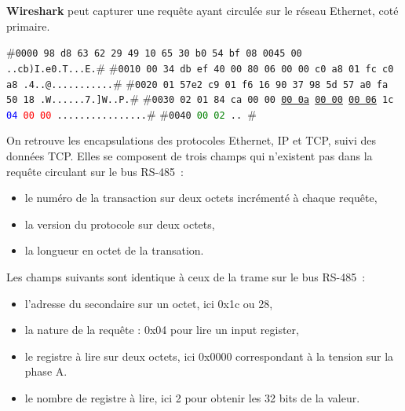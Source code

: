 \documentclass[11pt,fleqn]{book} %
\newcommand\Index[1]{\textbf{#1}\index{#1}}
\begin{document}
    \vspace{1em}

\Index{Wireshark} peut capturer une requête ayant circulée sur le réseau Ethernet, coté primaire.


\begin{termc}[backgroundcolor=\color{backcolour}, escapechar=#]
#\texttt{\small{0000 \colorbox{purple!50}{98 d8 63 62 29 49 10 65 30 b0 54 bf 08 00}\colorbox{blue!30}{45 00}   ..cb)I.e0.T...E.}}#
#\texttt{\small{0010  \colorbox{blue!30}{00 34 db ef 40 00 80 06 00 00 c0 a8 01 fc c0 a8}   .4..@...........}}#
#\texttt{\small{0020  \colorbox{blue!30}{01 57}\colorbox{red!30}{e2 c9 01 f6 16 90 37 98 5d 57 a0 fa 50 18}   .W......7.]W..P.}}#
#\texttt{\small{0030  \colorbox{red!30}{02 01 84 ca 00 00} \ul{00 0a} \ul{00 00} \ul{00 06} 1c \textcolor{blue}{04} \textcolor{red}{00 00}   ................}}#
#\texttt{\small{0040  \textcolor{green}{00 02}   ..              }}#                                 
\end{termc}

On retrouve les encapsulations des protocoles Ethernet, IP et TCP, suivi des données TCP. Elles se composent de  trois champs qui n'existent pas dans la requête circulant sur le bus RS-485~:
\begin{itemize}
    \item le numéro de la transaction sur deux octets incrémenté à chaque requête,
    \item la version du protocole sur deux octets, 
    \item la longueur en octet de la transation.
\end{itemize}

    \vspace{1em}

Les champs suivants sont identique à ceux de la trame sur le bus RS-485~:
\begin{itemize}
    \item l'adresse du secondaire sur un octet, ici 0x1c ou 28,
    \item la nature de la requête : 0x04 pour lire un input register,
    \item le registre à lire sur deux octets, ici 0x0000 correspondant à la tension sur la phase A.
    \item le nombre de registre à lire, ici 2 pour obtenir les 32 bits de la valeur.
\end{itemize}

    \vspace{1em}
\end{document}
